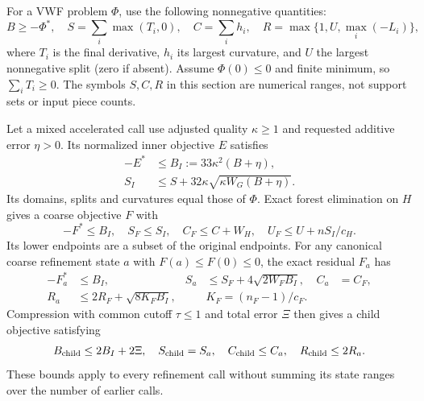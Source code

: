 For a VWF problem $\Phi$, use the following nonnegative quantities:
\[
 B\geq-\Phi^*,\quad
 S=\sum_i\max(T_i,0),\quad C=\sum_i h_i,\quad
 R=\max\{1,U,\max_i(-L_i)\},
\]
where $T_i$ is the final derivative, $h_i$ its largest curvature, and
$U$ the largest nonnegative split (zero if absent). Assume $\Phi(0)\leq0$
and finite minimum, so $\sum_iT_i\geq0$. The symbols $S,C,R$ in this
section are numerical ranges, not support sets or input piece counts.

\begin{lemma}
\label{lem:op3-single-recursive-ranges}
Let a mixed accelerated call use adjusted quality $\kappa\geq1$ and
requested additive error $\eta>0$. Its normalized inner objective $E$
satisfies
\begin{align*}
 -E^*&\leq B_I:=33\kappa^2(B+\eta),\\
 S_I&\leq S+32\kappa\sqrt{\kappa W_G(B+\eta)}.
\end{align*}
Its domains, splits and curvatures equal those of $\Phi$.
Exact forest elimination on $H$ gives a coarse objective $F$ with
\[
 -F^*\leq B_I,\quad S_F\leq S_I,\quad C_F\leq C+W_H,
 \quad U_F\leq U+nS_I/c_H.
\]
Its lower endpoints are a subset of the original endpoints.
For any canonical coarse refinement state $a$ with
$F(a)\leq F(0)\leq0$, the exact residual $F_a$ has
\begin{align*}
 -F_a^*&\leq B_I,&
 S_a&\leq S_F+4\sqrt{2W_FB_I},& C_a&=C_F,\\
 R_a&\leq2R_F+\sqrt{8K_FB_I},&&K_F=(n_F-1)/c_F.
\end{align*}
Compression with common cutoff $\tau\leq1$ and total error $\Xi$
then gives a child objective satisfying
\[
 B_{\rm child}\leq2B_I+2\Xi,\quad
 S_{\rm child}=S_a,\quad C_{\rm child}\leq C_a,
 \quad R_{\rm child}\leq2R_a.
\]
These bounds apply to every refinement call without summing its state
ranges over the number of earlier calls.
\end{lemma}
